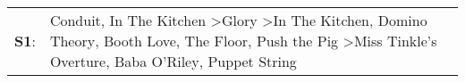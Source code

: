 \begin{supertabular}{p{0.03\textwidth}p{0.92\textwidth}}
 \textbf{S1}:  &  Conduit\textsuperscript{}, \enspace In The Kitchen\textsuperscript{} \textgreater \enspace Glory\textsuperscript{} \textgreater \enspace In The Kitchen\textsuperscript{}, \enspace Domino Theory\textsuperscript{}, \enspace Booth Love\textsuperscript{}, \enspace The Floor\textsuperscript{}, \enspace Push the Pig\textsuperscript{} \textgreater \enspace Miss Tinkle's Overture\textsuperscript{}, \enspace Baba O'Riley\textsuperscript{}, \enspace Puppet String\textsuperscript{}  \enspace  \\
\end{supertabular}
